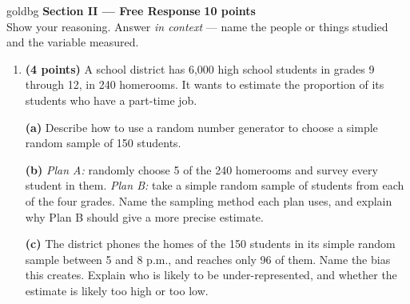\documentclass[12pt]{article}
\begin{document}
\vspace{0.14in}

\boxguard[30]
\begin{headlinebox}{goldbg}
\small
\textbf{Section II --- Free Response} \hfill \textbf{10 points}\\
Show your reasoning. Answer \emph{in context} --- name the people or things studied and the
variable measured.
\end{headlinebox}

\vspace{0.10in}

\begin{enumerate}[leftmargin=1.9em, itemsep=0.16in, resume]

  \boxguard[26]
  \item \textbf{(4 points)} A school district has 6{,}000 high school students in grades 9
        through 12, in 240 homerooms. It wants to estimate the proportion of its students who
        have a part-time job.

        \vspace{6pt}
        \textbf{(a)} Describe how to use a random number generator to choose a simple random
        sample of 150 students.\\[4pt]

        \boxguard[16]
        \vspace{6pt}
        \textbf{(b)} \emph{Plan A:} randomly choose 5 of the 240 homerooms and survey every
        student in them. \emph{Plan B:} take a simple random sample of students from each of the
        four grades. Name the sampling method each plan uses, and explain why Plan B should give
        a more precise estimate.\\[4pt]

        \boxguard[16]
        \vspace{6pt}
        \textbf{(c)} The district phones the homes of the 150 students in its simple random
        sample between 5 and 8 p.m., and reaches only 96 of them. Name the bias this creates.
        Explain who is likely to be under-represented, and whether the estimate is likely too
        high or too low.\\[4pt]


\end{enumerate}
\end{document}
